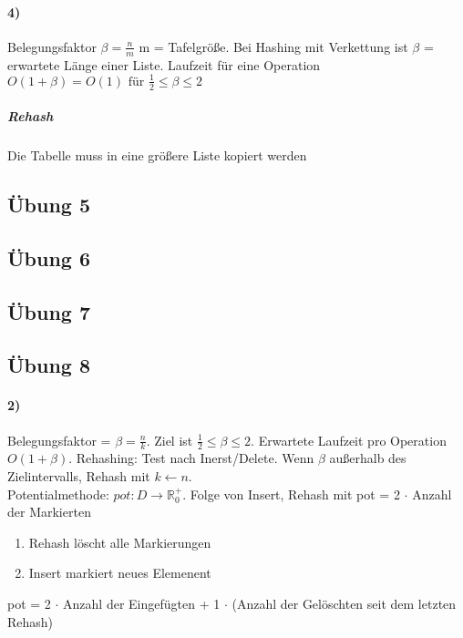 \paragraph{4)} Belegungsfaktor $ \beta = \frac{n}{m} $ m = Tafelgröße. Bei Hashing mit Verkettung ist $ \beta $ = erwartete Länge einer Liste. Laufzeit für eine Operation $ O(1+\beta) = O(1) \text{ für } \frac{1}{2} \leq \beta \leq 2$ 
\subparagraph{Rehash} Die Tabelle muss in eine größere Liste kopiert werden \\
\begin{algorithm}[H]

\end{algorithm}

\subsection*{Übung 5}

\subsection*{Übung 6}

\subsection*{Übung 7}

\subsection*{Übung 8}
\paragraph{2)} Belegungsfaktor = $ \beta = \frac{n}{k} $. Ziel ist $ \frac{1}{2} \leq \beta \leq 2 $. Erwartete Laufzeit pro Operation $ O(1 + \beta) $. Rehashing: Test nach Inerst/Delete. Wenn $ \beta $ außerhalb des Zielintervalls, Rehash mit $ k \gets n $. \\
Potentialmethode: $ pot: D \rightarrow \mathbb{R}^+_0 $. Folge von Insert, Rehash mit pot = 2 $ \cdot $ Anzahl der Markierten
\begin{enumerate}
    \item Rehash löscht alle Markierungen
    \item Insert markiert neues Elemenent
\end{enumerate} 
pot = 2 $ \cdot $ Anzahl der Eingefügten + 1 $ \cdot $ (Anzahl der Gelöschten seit dem letzten Rehash) \\

